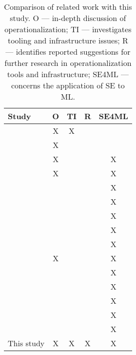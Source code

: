 \begin{table}[h]
    \centering
    \begin{tabular}{l c c c c}
        Study & O & TI & R & SE4ML \\
        \hline
        \textcite{Shahin2017} & X & X & & \\
        \textcite{Rodriguez2017} & X & & & \\
        \textcite{Baier2019} & X & & & X \\
        \textcite{Paleyes2020} & X & & & X \\
        \textcite{Kumeno2020} & & & & X \\
        \textcite{Nascimento2020} & & & & X \\
        \textcite{Lwakatare2020} & & & & X \\
        \textcite{Lwakatare2020a} & & & & X \\
        \textcite{Serban2020} & & & & X \\
        \textcite{John2021} & X & & & X \\
        \textcite{Giray2021} & & & & X \\
        \textcite{Lorenzoni2021} & & & & X \\
        \textcite{MartinezFernandez2021} & & & & X \\
        \textcite{Serban2021} & & & & X \\
        \textcite{John2021a} & & & & X \\
        This study & X & X & X & X \\
    \end{tabular}
    \caption{Comparison of related work with this study. O --- in-depth discussion of operationalization; TI --- investigates tooling and infrastructure issues; R --- identifies reported suggestions for further research in operationalization tools and infrastructure; SE4ML --- concerns the application of SE to ML.}
    \label{tab:related_work_comparison}
\end{table}
